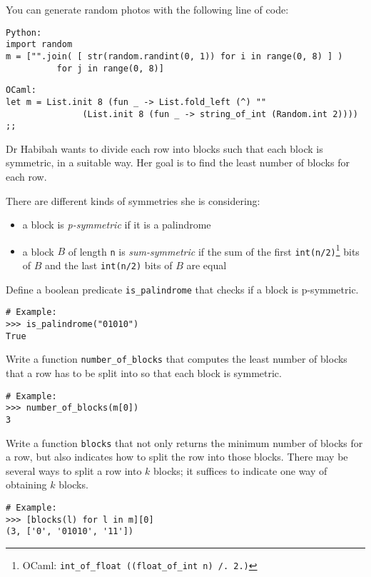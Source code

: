 \documentclass[arhiv]{../izpit}
\begin{document}
You can generate random photos with the following line of code:
\begin{verbatim}
Python:
import random
m = ["".join( [ str(random.randint(0, 1)) for i in range(0, 8) ] )
          for j in range(0, 8)]
\end{verbatim}

\begin{verbatim}
OCaml:
let m = List.init 8 (fun _ -> List.fold_left (^) ""
               (List.init 8 (fun _ -> string_of_int (Random.int 2)))) ;;
\end{verbatim}


Dr Habibah wants to divide each row into blocks such that each block is symmetric, in a suitable way. Her goal is to find the least number of blocks for each row.

There are different kinds of symmetries she is considering:
\begin{itemize}
\item a block is \emph{p-symmetric} if it is a palindrome
\item a block $B$ of length \verb|n| is \emph{sum-symmetric} if the sum of the first
\verb|int(n/2)|\footnote{OCaml: \verb|int_of_float ((float_of_int n) /. 2.)|} bits of $B$
  and the last \verb|int(n/2)| bits of $B$ are equal
\end{itemize}

\podnaloga
Define a boolean predicate \verb|is_palindrome| that checks if a block is p-symmetric.
\begin{verbatim}
# Example:
>>> is_palindrome("01010")
True
\end{verbatim}

\podnaloga
Write a function \verb|number_of_blocks| that computes the least number of blocks that a row has to be split into so that each block is symmetric.

\begin{verbatim}
# Example:
>>> number_of_blocks(m[0])
3
\end{verbatim}

\podnaloga
Write a function \verb|blocks| that not only returns the minimum number of blocks for a row, but also indicates how to split the row into those blocks. There may be several ways to split a row into $k$ blocks; it suffices to indicate one way of obtaining $k$ blocks.

\begin{verbatim}
# Example:
>>> [blocks(l) for l in m][0]
(3, ['0', '01010', '11'])
\end{verbatim}
\end{document}
